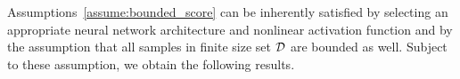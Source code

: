Assumptions~\ref{assume:bounded_score} can be inherently satisfied by selecting an appropriate neural network architecture and nonlinear activation function and by the assumption that all samples in finite size set $\mathcal{D}$ are bounded as well. {Subject to these assumption, we obtain the following results.}


